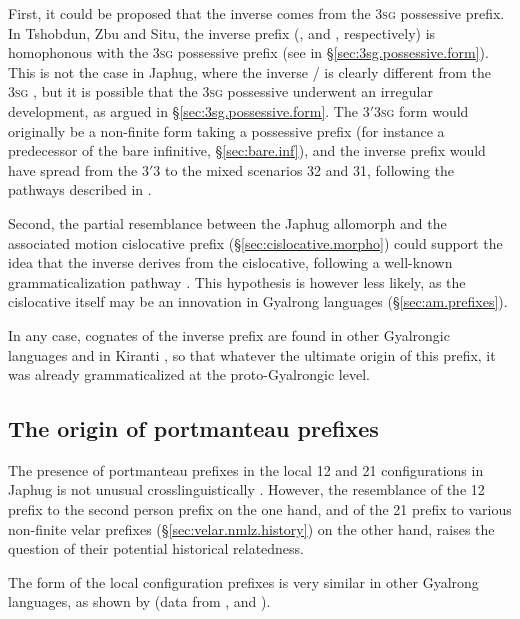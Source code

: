 First, it could be proposed that the inverse comes from the \textsc{3sg} possessive prefix. In Tshobdun, Zbu and Situ, the inverse prefix (,  and , respectively) is homophonous with the \textsc{3sg} possessive prefix (see  in §\ref{sec:3sg.possessive.form}). This is not the case in Japhug, where the inverse  /  is clearly different from the \textsc{3sg} , but it is possible that the \textsc{3sg} possessive underwent an irregular development, as argued in §\ref{sec:3sg.possessive.form}. The 3$'$\fl{}3\textsc{sg} form would originally be a non-finite form taking a possessive prefix (for instance a predecessor of the bare infinitive, §\ref{sec:bare.inf}), and the inverse prefix would have spread from the 3$'$\fl{}3 to the mixed scenarios 3\fl{}2 and 3\fl{}1, following the pathways described in \citealt{jacques18directionality}.

Second, the partial resemblance between the Japhug allomorph  and the associated motion cislocative  prefix (§\ref{sec:cislocative.morpho}) could support the idea that the inverse derives from the cislocative, following a well-known grammaticalization pathway \citep{jacques14inverse}. This hypothesis is however less likely, as the cislocative itself may be an innovation in Gyalrong languages (§\ref{sec:am.prefixes}).
 
In any case, cognates of the inverse prefix are found in other Gyalrongic languages \citep{lai15person} and in Kiranti \citep{jacques12agreement}, so that whatever the ultimate origin of this prefix, it was already grammaticalized at the proto-Gyalrongic level.

\subsection{The origin of portmanteau prefixes} \label{sec:portmanteau.prefixes.history}
  
The presence of portmanteau prefixes in the local 1\fl{}2 and 2\fl{}1 configurations in Japhug is not unusual crosslinguistically \citep{heath98skewing}. However, the resemblance of the 1\fl{}2 prefix  to the second person  prefix on the one hand, and of the 2\fl{}1 prefix  to various non-finite velar prefixes (§\ref{sec:velar.nmlz.history}) on the other hand, raises the question of their potential historical relatedness. 

The form of the local configuration prefixes is very similar in other Gyalrong languages, as shown by  (data from \citealt[218]{linxr93jiarong}, \citealt{jackson02rentongdengdi} and \citealt{gongxun14agreement}). 

